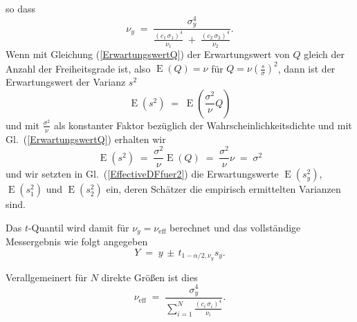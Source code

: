 so dass
\begin{equation}
\nu_y \; = \; \frac{\sigma_y^4}{\frac{(c_1 \, \sigma_1)^4}{\nu_1}
 \; + \; \frac{(c_2 \, \sigma_2)^4}{\nu_2}} .
\label{EffectiveDFfuer2}
\end{equation}
Wenn mit Gleichung (\ref{ErwartungswertQ}) der Erwartungswert
von $Q$ gleich der Anzahl der Freiheitsgrade ist, also $\operatorname{E}(Q) = \nu$
für $Q = \nu \left(\frac{s}{\sigma}\right)^2$, dann ist der Erwartungswert der
Varianz $s^2$
\begin{equation}
\operatorname{E}(s^2) \; = \; \operatorname{E}(\frac{\sigma^2}{\nu} Q)
\end{equation}
und mit $\frac{\sigma^2}{\nu}$ als konstanter Faktor bezüglich der Wahrscheinlichkeitsdichte
und mit Gl.~(\ref{ErwartungswertQ}) erhalten wir
\begin{equation}
\operatorname{E}(s^2) \; = \; \frac{\sigma^2}{\nu}  \operatorname{E}(Q) \; = \;
\frac{\sigma^2}{\nu} \nu \; = \; \sigma^2
\end{equation}
und wir setzten in Gl.~(\ref{EffectiveDFfuer2}) die Erwartungswerte
$\operatorname{E}(s_y^2)$, $\operatorname{E}(s_1^2)$ und $\operatorname{E}(s_2^2)$ ein,
deren Schätzer die empirisch ermittelten Varianzen sind.

Das $t$-Quantil wird damit für $\nu_y = \nu_\mathrm{eff}$ berechnet und das vollständige Messergebnis wie folgt
angegeben
\begin{equation}
Y \; = \; y \, \pm \, t_{1-\alpha/2,\nu_y} s_y .
\label{vollstaendigesSatterthwaite}
\end{equation}


Verallgemeinert für $N$ direkte Größen ist dies
\begin{equation}
\nu_\mathrm{eff} \; = \; \frac{\sigma_y^4}{\sum\limits_{i=1}^N \frac{(c_i \, \sigma_i)^4}{\nu_i}} .
\label{EffectiveDFviele}
\end{equation}


